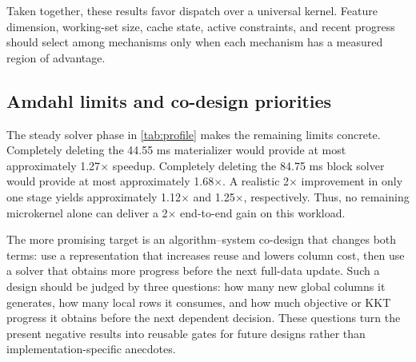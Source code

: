 Taken together, these results favor dispatch over a universal kernel. Feature
dimension, working-set size, cache state, active constraints, and recent
progress should select among mechanisms only when each mechanism has a
measured region of advantage.

\subsection{Amdahl limits and co-design priorities}

The steady solver phase in \cref{tab:profile} makes the remaining limits
concrete. Completely deleting the 44.55 ms materializer would provide at most
approximately 1.27$\times$ speedup. Completely deleting the 84.75 ms block
solver would provide at most approximately 1.68$\times$. A realistic
2$\times$ improvement in only one stage yields approximately 1.12$\times$ and
1.25$\times$, respectively. Thus, no remaining microkernel alone can deliver
a 2$\times$ end-to-end gain on this workload.

The more promising target is an algorithm--system co-design that changes both
terms: use a representation that increases reuse and lowers column cost, then
use a solver that obtains more progress before the next full-data update. Such
a design should be judged by three questions: how many new global columns it
generates, how many local rows it consumes, and how much objective or KKT
progress it obtains before the next dependent decision. These questions turn
the present negative results into reusable gates for future designs rather
than implementation-specific anecdotes.
